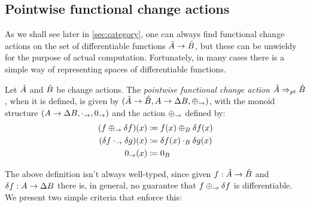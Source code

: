 \subsection{Pointwise functional change actions}
\label{sec:pointwiseFunctional}

As we shall see later in \cref{sec:category}, one can always find functional change actions on the set
of differentiable functions $\hat{A} \rightarrow \hat{B}$, but these can be unwieldy for 
the purpose of actual computation. Fortunately, in many cases there is a simple
way of representing spaces of differentiable functions.

\begin{defn}
  Let $\hat{A}$ and $\hat{B}$ be change actions. The \emph{pointwise functional change action} 
  $\hat{A} \Rightarrow_{pt} \hat{B}$, when it is defined,
  is given by $(\hat{A} \rightarrow \hat{B}, A \rightarrow \Delta B, \oplus_\rightarrow)$, with
  the monoid structure $(A \rightarrow \Delta B, \cdot_\rightarrow, 0_\rightarrow)$ and the action 
  $\oplus_\rightarrow$ defined by:
  \begin{align*}
    (f \oplus_\to \delta f)(x) &\coloneqq f(x) \oplus_B \delta f (x)\\
    (\delta f \cdot_\rightarrow \delta g)(x) &\coloneqq \delta f(x) \cdot_B \delta g(x)\\
    0_\rightarrow (x) &\coloneqq 0_B
  \end{align*}
\end{defn}

The above definition isn't always well-typed, since given $f : \hat{A} \rightarrow \hat{B}$ and
$\delta f : A \rightarrow \Delta B$ there is, in general, no guarantee that 
$f \oplus_\rightarrow \delta f$ is differentiable. We present two simple criteria that enforce this:

